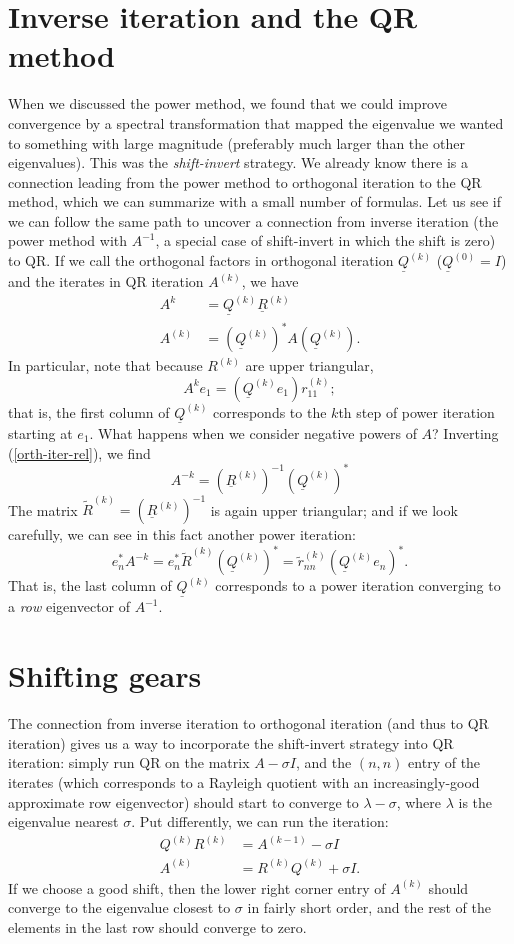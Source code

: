\documentclass[12pt, leqno]{article} %
\newcommand{\uQ}{\underline{Q}}
\newcommand{\uR}{\underline{R}}
\begin{document}
\section*{Inverse iteration and the QR method}

When we discussed the power method, we found that we could improve
convergence by a spectral transformation that mapped the eigenvalue we
wanted to something with large magnitude (preferably much larger than
the other eigenvalues).  This was the {\em shift-invert} strategy.
We already know there is a connection leading from the power method
to orthogonal iteration to the QR method, which we can summarize with
a small number of formulas.  Let us see if we can follow the same
path to uncover a connection from inverse iteration (the power method
with $A^{-1}$, a special case of shift-invert in which the shift is zero) to QR.
If we call the orthogonal factors
in orthogonal iteration  $\uQ^{(k)}$ ($\uQ^{(0)} = I$) and the iterates 
in QR iteration $A^{(k)}$, we have
\begin{align}
  A^{k}   &= \uQ^{(k)} \uR^{(k)} \label{orth-iter-rel} \\
  A^{(k)} &= (\uQ^{(k)})^* A (\uQ^{(k)}).
\end{align}
In particular, note that because $R^{(k)}$ are upper triangular,
\[
  A^{k} e_1 = (\uQ^{(k)} e_1) r^{(k)}_{11};
\]
that is, the first column of $\uQ^{(k)}$ corresponds to the $k$th
step of power iteration starting at $e_1$.  What happens when we
consider negative powers of $A$?  Inverting (\ref{orth-iter-rel}),
we find
\[
  A^{-k} = (\uR^{(k)})^{-1} (\uQ^{(k)})^*
\]
The matrix $\tilde{R}^{(k)} = (\uR^{(k)})^{-1}$ is again upper triangular;
and if we look carefully, we can see in this fact another power iteration:
\[
  e_n^* A^{-k} = e_n^* \tilde{R}^{(k)} (\uQ^{(k)})^* 
              = \tilde{r}^{(k)}_{nn} (\uQ^{(k)} e_n)^*.
\]
That is, the last column of $\uQ^{(k)}$ corresponds to a power iteration
converging to a {\em row} eigenvector of $A^{-1}$.

\section*{Shifting gears}

The connection from inverse iteration to orthogonal iteration (and
thus to QR iteration) gives us a way to incorporate the shift-invert
strategy into QR iteration: simply run QR on the matrix $A-\sigma I$,
and the $(n,n)$ entry of the iterates (which corresponds to a Rayleigh
quotient with an increasingly-good approximate row eigenvector) should
start to converge to $\lambda - \sigma$, where $\lambda$ is the
eigenvalue nearest $\sigma$.  Put differently, we can run the
iteration:
\begin{align*}
  Q^{(k)} R^{(k)} &= A^{(k-1)} - \sigma I \\
  A^{(k)} &= R^{(k)} Q^{(k)} + \sigma I.
\end{align*}
If we choose a good shift, then the lower right corner entry of
$A^{(k)}$ should converge to the eigenvalue closest to $\sigma$ in
fairly short order, and the rest of the elements in the last row
should converge to zero.
\end{document}
